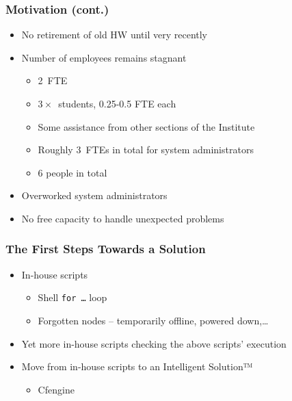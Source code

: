 \documentclass{beamer}
\begin{document}
\begin{frame}[fragile]
\frametitle{Motivation (cont.)}
\begin{itemize}
    \item No retirement of old HW until very recently
    \item Number of employees remains stagnant
        \begin{itemize}
            \item 2~FTE
            \item $3\times$~students, 0.25-0.5 FTE each
            \item Some assistance from other sections of the Institute
            \item Roughly 3~FTEs in total for system administrators
            \item 6 people in total
        \end{itemize}
    \item Overworked system administrators
    \item No free capacity to handle unexpected problems
\end{itemize}
\end{frame}

\begin{frame}[fragile]
\frametitle{The First Steps Towards a Solution}
\begin{itemize}
    \item In-house scripts
        \begin{itemize}
            \item Shell {\tt for \ldots} loop
            \item Forgotten nodes -- temporarily offline, powered down,\ldots
        \end{itemize}
    \item Yet more in-house scripts checking the above scripts' execution
    \item Move from in-house scripts to an Intelligent Solution™
        \begin{itemize}
            \item Cfengine
        \end{itemize}
\end{itemize}
\end{frame}
\end{document}
